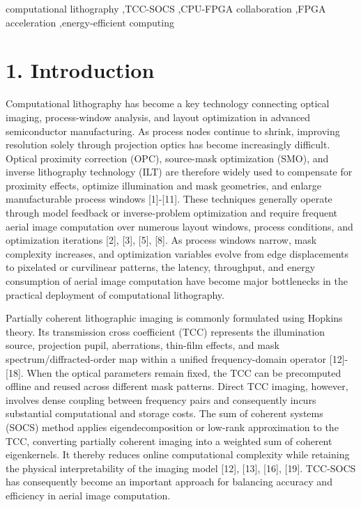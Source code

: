 \documentclass[
  preprint]{elsarticle}
\begin{document}
\begin{frontmatter}
\begin{abstract}
\end{abstract}

\begin{keyword}
computational lithography \sep TCC-SOCS \sep CPU-FPGA collaboration \sep FPGA acceleration \sep energy-efficient computing
\end{keyword}
\end{frontmatter}

\section{1. Introduction}\label{introduction}

Computational lithography has become a key technology connecting optical
imaging, process-window analysis, and layout optimization in advanced
semiconductor manufacturing. As process nodes continue to shrink,
improving resolution solely through projection optics has become
increasingly difficult. Optical proximity correction (OPC), source-mask
optimization (SMO), and inverse lithography technology (ILT) are
therefore widely used to compensate for proximity effects, optimize
illumination and mask geometries, and enlarge manufacturable process
windows {[}1{]}-{[}11{]}. These techniques generally operate through
model feedback or inverse-problem optimization and require frequent
aerial image computation over numerous layout windows, process
conditions, and optimization iterations {[}2{]}, {[}3{]}, {[}5{]},
{[}8{]}. As process windows narrow, mask complexity increases, and
optimization variables evolve from edge displacements to pixelated or
curvilinear patterns, the latency, throughput, and energy consumption of
aerial image computation have become major bottlenecks in the practical
deployment of computational lithography.

Partially coherent lithographic imaging is commonly formulated using
Hopkins theory. Its transmission cross coefficient (TCC) represents the
illumination source, projection pupil, aberrations, thin-film effects,
and mask spectrum/diffracted-order map within a unified frequency-domain
operator {[}12{]}-{[}18{]}. When the optical parameters remain fixed,
the TCC can be precomputed offline and reused across different mask
patterns. Direct TCC imaging, however, involves dense coupling between
frequency pairs and consequently incurs substantial computational and
storage costs. The sum of coherent systems (SOCS) method applies
eigendecomposition or low-rank approximation to the TCC, converting
partially coherent imaging into a weighted sum of coherent eigenkernels.
It thereby reduces online computational complexity while retaining the
physical interpretability of the imaging model {[}12{]}, {[}13{]},
{[}16{]}, {[}19{]}. TCC-SOCS has consequently become an important
approach for balancing accuracy and efficiency in aerial image
computation.
\end{document}
